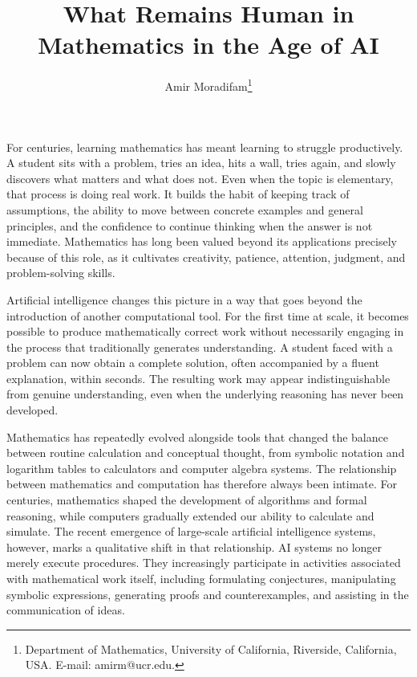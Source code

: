 \documentclass[12pt]{article}
\title{What Remains Human in Mathematics in the Age of AI}
\author{ 
    Amir Moradifam\footnote{Department of Mathematics, University of California, Riverside, California, USA. E-mail: amirm@ucr.edu. }
}
\date{}
\begin{document}
\maketitle

\vspace{1cm}
For centuries, learning mathematics has meant learning to struggle productively. A student sits with a problem, tries an idea, hits a wall, tries again, and slowly discovers what matters and what does not. Even when the topic is elementary, that process is doing real work. It builds the habit of keeping track of assumptions, the ability to move between concrete examples and general principles, and the confidence to continue thinking when the answer is not immediate. Mathematics has long been valued beyond its applications precisely because of this role, as it cultivates creativity, patience, attention, judgment, and problem-solving skills.

Artificial intelligence changes this picture in a way that goes beyond the introduction of another computational tool. For the first time at scale, it becomes possible to produce mathematically correct work without necessarily engaging in the process that traditionally generates understanding. A student faced with a problem can now obtain a complete solution, often accompanied by a fluent explanation, within seconds. The resulting work may appear indistinguishable from genuine understanding, even when the underlying reasoning has never been developed.

Mathematics has repeatedly evolved alongside tools that changed the balance between routine calculation and conceptual thought, from symbolic notation and logarithm tables to calculators and computer algebra systems. The relationship between mathematics and computation has therefore always been intimate. For centuries, mathematics shaped the development of algorithms and formal reasoning, while computers gradually extended our ability to calculate and simulate. The recent emergence of large-scale artificial intelligence systems, however, marks a qualitative shift in that relationship. AI systems no longer merely execute procedures. They increasingly participate in activities associated with mathematical work itself, including formulating conjectures, manipulating symbolic expressions, generating proofs and counterexamples, and assisting in the communication of ideas.
\end{document}

